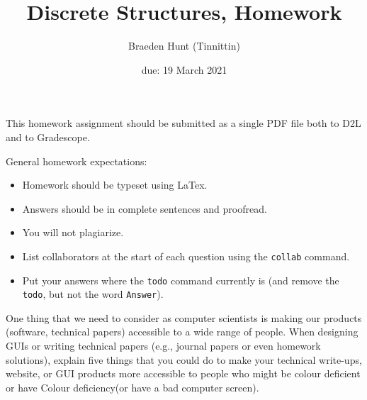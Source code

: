 \documentclass{article}
\title{Discrete Structures, Homework \hwnum}
\author{Braeden Hunt (Tinnittin)}
\date{due: 19 March 2021}
\begin{document}
\maketitle

This homework assignment should be
submitted as a single PDF file both to D2L and to Gradescope.

General homework expectations:
\begin{itemize}
    \item Homework should be typeset using LaTex.
    \item Answers should be in complete sentences and proofread.
    \item You will not plagiarize.
    \item List collaborators at the start of each question using the \texttt{collab} command.
    \item Put your answers where the \texttt{todo} command currently is (and
        remove the \texttt{todo}, but not the word \texttt{Answer}).
\end{itemize}


 

One thing that we need to consider as computer scientists is making our products
(software, technical papers) accessible to a wide range of people. When
designing GUIs or writing technical papers (e.g., journal papers or even
homework solutions), explain five things that you could do to make your
technical write-ups, website, or GUI products more accessible to people who
might be colour deficient or have Colour deficiency(or have a bad computer screen).
\end{document}

